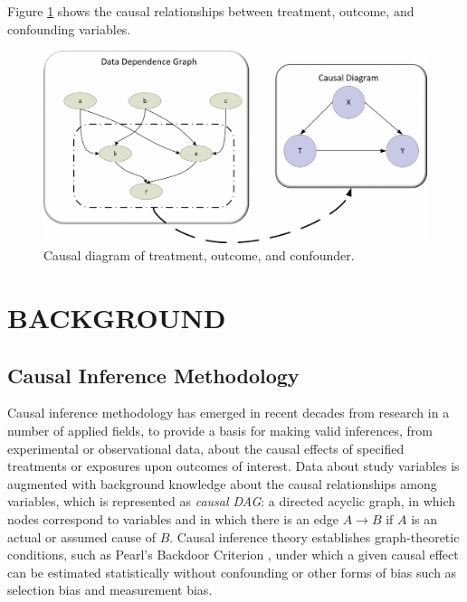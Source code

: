 Figure \ref{dag1} shows the causal relationships between treatment, outcome, and confounding variables.
\begin{figure}[!thpb]
\centering
\includegraphics[width=1\textwidth]{chapter3_causal_dag.pdf}
\caption{Causal diagram of treatment, outcome, and confounder.}
\label{dag1}
\end{figure}


\section{BACKGROUND}\label{background}
\subsection{Causal Inference Methodology}\label{IIIA}
Causal inference methodology \cite{Pearl2003} has emerged in recent decades from research in a number of applied fields, to provide a basis for making valid inferences, from experimental or observational data, about the causal effects of specified treatments or exposures upon outcomes of interest.  Data about study variables is augmented with background knowledge about the causal relationships among variables, which is represented as {\it causal DAG}: a directed acyclic graph, in which nodes correspond to variables and in which there is an edge $A \to B$ if $A$ is an actual or assumed cause of $B$.  Causal inference theory establishes graph-theoretic conditions, such as Pearl's Backdoor Criterion \cite{Pearl2003}, under which a given causal effect can be estimated statistically without confounding or other forms of bias such as selection bias and measurement bias.



